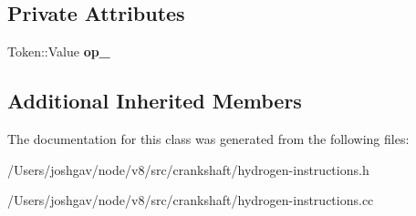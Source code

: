 \subsection*{Private Attributes}
\begin{DoxyCompactItemize}
\item 
Token\+::\+Value {\bfseries op\+\_\+}\hypertarget{classv8_1_1internal_1_1_h_bitwise_a2208b9f071f1536b7befe1c045d42ea5}{}\label{classv8_1_1internal_1_1_h_bitwise_a2208b9f071f1536b7befe1c045d42ea5}

\end{DoxyCompactItemize}
\subsection*{Additional Inherited Members}


The documentation for this class was generated from the following files\+:\begin{DoxyCompactItemize}
\item 
/\+Users/joshgav/node/v8/src/crankshaft/hydrogen-\/instructions.\+h\item 
/\+Users/joshgav/node/v8/src/crankshaft/hydrogen-\/instructions.\+cc\end{DoxyCompactItemize}
